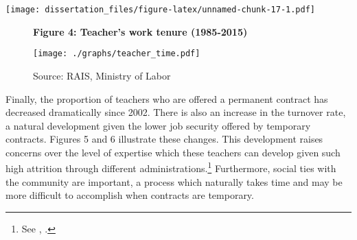 \documentclass[12pt,]{book}
\newenvironment{Shaded}{\begin{snugshade}}{\end{snugshade}}
\newcommand{\DataTypeTok}[1]{\textcolor[rgb]{0.13,0.29,0.53}{#1}}
\newcommand{\DecValTok}[1]{\textcolor[rgb]{0.00,0.00,0.81}{#1}}
\newcommand{\KeywordTok}[1]{\textcolor[rgb]{0.13,0.29,0.53}{\textbf{#1}}}
\newcommand{\NormalTok}[1]{#1}
\newcommand{\OperatorTok}[1]{\textcolor[rgb]{0.81,0.36,0.00}{\textbf{#1}}}
\newcommand{\StringTok}[1]{\textcolor[rgb]{0.31,0.60,0.02}{#1}}
\let\rmarkdownfootnote\footnote%
\def\footnote{\protect\rmarkdownfootnote}
\begin{document}
\begin{Shaded}
\end{Shaded}

\texttt{[image: dissertation\_files/figure-latex/unnamed-chunk-17-1.pdf]}

\begin{figure}
    \centering
    \textbf{\small Figure 4: Teacher's work tenure (1985-2015)}\par\medskip
    \texttt{[image: ./graphs/teacher\_time.pdf]}
    \caption*{\footnotesize \hfill Source: RAIS, Ministry of Labor}
\end{figure}

Finally, the proportion of teachers who are offered a permanent contract has decreased dramatically since 2002. There is also an increase in the turnover rate, a natural development given the lower job security offered by temporary contracts. Figures 5 and 6 illustrate these changes. This development raises concerns over the level of expertise which these teachers can develop given such high attrition through different administrations.\footnote{See \citet{gailmard_slackers_2007}, \citet{akhtari_political_2015}.} Furthermore, social ties with the community are important, a process which naturally takes time and may be more difficult to accomplish when contracts are temporary.
\end{document}
